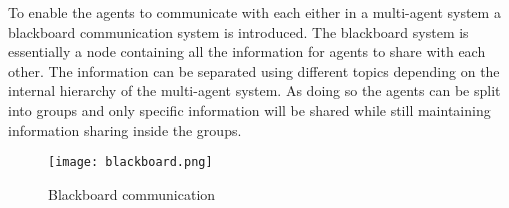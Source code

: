
To enable the agents to communicate with each either in a multi-agent system a blackboard communication system is introduced. 
The blackboard system is essentially a node containing all the information for agents to share with each other. 
The information can be separated using different topics depending on the internal hierarchy of the multi-agent system. 
As doing so the agents can be split into groups and only specific information will be shared while still maintaining information sharing inside the groups.

\begin{figure}[ht]
    \centering
    \texttt{[image: blackboard.png]}
    \caption[Blackboard communication]{Blackboard communication}
\end{figure}

